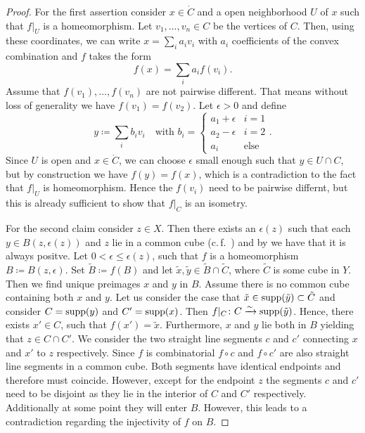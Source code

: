 \begin{proof}
  For the first assertion consider \(x \in \mathring{C}\) and a open neighborhood \(U\) of \(x\) such that \(f|_U\) is a homeomorphism. Let \(v_1, \dots, v_n \in C\) be the vertices of \(C\). Then, using these coordinates, we can write \(x = \sum_i a_i v_i\) with \(a_i\) coefficients of the convex combination and \(f\) takes the form
  \[
    f(x) = \sum_i a_i f(v_i).
  \]
  Assume that \(f(v_1), \dots, f(v_n)\) are not pairwise different. That means without loss of generality we have \(f(v_1) = f(v_2)\). Let \(\epsilon > 0\) and define
  \[
    y \coloneqq \sum_i b_i v_i \quad \text{with } b_i = \begin{cases}a_1 + \epsilon & i = 1\\a_2 - \epsilon & i = 2\\ a_i & \text{else}\end{cases}.
  \]
  Since \(U\) is open and \(x \in \mathring{C}\), we can choose \(\epsilon\) small enough such that \(y \in U \cap C\), but by construction we have \(f(y) = f(x)\), which is a contradiction to the fact that \(f|_U\) is homeomorphism. Hence the \(f(v_i)\) need to be pairwise differnt, but this is already sufficient to show that \(f|_C\) is an isometry.

  For the second claim consider \(z \in X\). Then there exists an \(\epsilon(z)\) such that each \(y \in B(z, \epsilon(z))\) and \(z\) lie in a common cube (c.\,f.~\cite[I.7.8-9]{MR1744486}) and by \textcite[I.7.33]{MR1744486} we have that it is always positve. Let \(0 < \epsilon \leq \epsilon(z)\), such that \(f\) is a homeomorphism \(B \coloneqq B(z, \epsilon)\). Set \(\tilde B \coloneqq f(B)\) and let \(\tilde x, \tilde y \in \tilde B \cap \tilde C\), where \(\tilde C\) is some cube in \(Y\). Then we find unique preimages \(x\) and \(y\) in \(B\).
  Assume there is no common cube containing both \(x\) and \(y\).
  Let us consider the case that \(\tilde x \in \operatorname{supp}(\tilde y) \subset \tilde C\) and consider \(C = \operatorname{supp}(y)\) and \(C' = \operatorname{supp}(x)\). Then \(f|_C\colon C \xrightarrow{\sim} \operatorname{supp}(\tilde y)\). Hence, there exists \(x' \in C\), such that \(f(x') = \tilde x\). Furthermore, \(x\) and \(y\) lie both in \(B\) yielding that \(z \in C \cap C'\). We consider the two straight line segments \(c\) and \(c'\) connecting \(x\) and \(x'\) to \(z\) respectively. Since \(f\) is combinatorial \(f \circ c\) and \(f \circ c'\) are also straight line segments in a common cube. Both segments have identical endpoints and therefore must coincide. However, except for the endpoint \(z\) the segments \(c\) and \(c'\) need to be disjoint as they lie in the interior of \(C\) and \(C'\) respectively. Additionally at some point they will enter \(B\). However, this leads to a contradiction regarding the injectivity of \(f\) on \(B\).


\end{proof}
